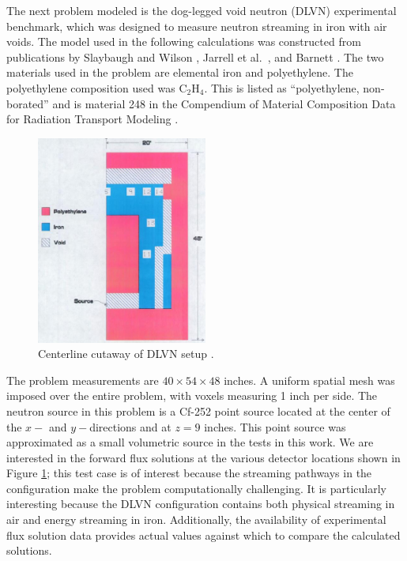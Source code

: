 \documentclass{article} %
\begin{document}
The next problem modeled is the dog-legged void neutron (DLVN) experimental
benchmark, which was designed to measure neutron streaming in iron with air
voids. The model used in the following calculations was constructed from
publications by Slaybaugh and Wilson \cite{sw-dlvn}, Jarrell et al.\
\cite{j-dlvn}, and Barnett \cite{dlvn1991}. The two materials used in the
problem are elemental iron and polyethylene. The polyethylene composition used
was C$_2$H$_4$. This is listed as ``polyethylene, non-borated'' and is
material 248 in the Compendium of Material Composition Data for Radiation
Transport Modeling \cite{pnnl}.

\begin{figure}[!htb]
\centering
\includegraphics[width=0.5\textwidth]{dlvn.png}
\caption{Centerline cutaway of DLVN setup \cite{sw-dlvn}.}
\label{dlvn}
\end{figure}

The problem measurements are $40\times54\times48$ inches. A uniform spatial
mesh was imposed over the entire problem, with voxels measuring 1 inch per
side. The neutron source in this problem is a Cf-252 point source located at
the center of the $x-$ and $y-$directions and at $z = 9$ inches. This point
source was approximated as a small volumetric source in the tests in this
work. We are interested in the forward flux solutions at the various detector
locations shown in Figure \ref{dlvn}; this test case is of interest
because the streaming pathways in the configuration make the problem
computationally challenging. It is particularly interesting because the DLVN
configuration contains both physical streaming in air and energy streaming in
iron. Additionally, the availability of experimental flux solution data
provides actual values against which to compare the calculated solutions.
\end{document}
